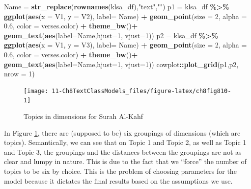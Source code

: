 \documentclass[
]{article}
\newenvironment{Shaded}{\begin{snugshade}}{\end{snugshade}}
\newcommand{\AttributeTok}[1]{\textcolor[rgb]{0.13,0.29,0.53}{#1}}
\newcommand{\DecValTok}[1]{\textcolor[rgb]{0.00,0.00,0.81}{#1}}
\newcommand{\FloatTok}[1]{\textcolor[rgb]{0.00,0.00,0.81}{#1}}
\newcommand{\FunctionTok}[1]{\textcolor[rgb]{0.13,0.29,0.53}{\textbf{#1}}}
\newcommand{\NormalTok}[1]{#1}
\newcommand{\OtherTok}[1]{\textcolor[rgb]{0.56,0.35,0.01}{#1}}
\newcommand{\SpecialCharTok}[1]{\textcolor[rgb]{0.81,0.36,0.00}{\textbf{#1}}}
\newcommand{\StringTok}[1]{\textcolor[rgb]{0.31,0.60,0.02}{#1}}
\begin{document}
\begin{Shaded}
\begin{Highlighting}[]
\NormalTok{Name }\OtherTok{=} \FunctionTok{str\_replace}\NormalTok{(}\FunctionTok{rownames}\NormalTok{(klsa\_df),}\StringTok{"text"}\NormalTok{,}\StringTok{""}\NormalTok{)}
\NormalTok{p1 }\OtherTok{=}\NormalTok{ klsa\_df }\SpecialCharTok{\%\textgreater{}\%} \FunctionTok{ggplot}\NormalTok{(}\FunctionTok{aes}\NormalTok{(}\AttributeTok{x =}\NormalTok{ V1, }\AttributeTok{y =}\NormalTok{ V2), }\AttributeTok{label=}\NormalTok{ Name) }\SpecialCharTok{+} 
  \FunctionTok{geom\_point}\NormalTok{(}\AttributeTok{size =} \DecValTok{2}\NormalTok{, }\AttributeTok{alpha =} \FloatTok{0.6}\NormalTok{, }\AttributeTok{color =}\NormalTok{ verses.color) }\SpecialCharTok{+}
  \FunctionTok{theme\_bw}\NormalTok{()}\SpecialCharTok{+}
  \FunctionTok{geom\_text}\NormalTok{(}\FunctionTok{aes}\NormalTok{(}\AttributeTok{label=}\NormalTok{Name,}\AttributeTok{hjust=}\DecValTok{1}\NormalTok{, }\AttributeTok{vjust=}\DecValTok{1}\NormalTok{))}
\NormalTok{p2 }\OtherTok{=}\NormalTok{ klsa\_df }\SpecialCharTok{\%\textgreater{}\%} \FunctionTok{ggplot}\NormalTok{(}\FunctionTok{aes}\NormalTok{(}\AttributeTok{x =}\NormalTok{ V1, }\AttributeTok{y =}\NormalTok{ V3), }\AttributeTok{label=}\NormalTok{ Name) }\SpecialCharTok{+} 
  \FunctionTok{geom\_point}\NormalTok{(}\AttributeTok{size =} \DecValTok{2}\NormalTok{, }\AttributeTok{alpha =} \FloatTok{0.6}\NormalTok{, }\AttributeTok{color =}\NormalTok{ verses.color) }\SpecialCharTok{+}
  \FunctionTok{theme\_bw}\NormalTok{()}\SpecialCharTok{+}
  \FunctionTok{geom\_text}\NormalTok{(}\FunctionTok{aes}\NormalTok{(}\AttributeTok{label=}\NormalTok{Name,}\AttributeTok{hjust=}\DecValTok{1}\NormalTok{, }\AttributeTok{vjust=}\DecValTok{1}\NormalTok{))}
\NormalTok{cowplot}\SpecialCharTok{::}\FunctionTok{plot\_grid}\NormalTok{(p1,p2, }\AttributeTok{nrow =} \DecValTok{1}\NormalTok{)}
\end{Highlighting}
\end{Shaded}

\begin{figure}

{\centering \texttt{[image: 11-Ch8TextClassModels\_files/figure-latex/ch8fig810-1]} 

}

\caption{Topics in dimensions for Surah Al-Kahf}\label{fig:ch8fig810}
\end{figure}

In Figure \ref{fig:ch8fig810}, there are (supposed to be) six groupings of dimensions (which are topics). Semantically, we can see that on Topic 1 and Topic 2, as well as Topic 1 and Topic 3, the groupings and the distances between the groupings are not as clear and lumpy in nature. This is due to the fact that we ``force'' the number of topics to be six by choice. This is the problem of choosing parameters for the model because it dictates the final results based on the assumptions we use.
\end{document}
